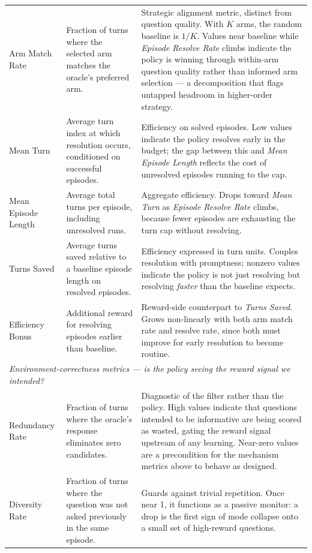 \documentclass[11pt]{article}
\theoremstyle{plain}
\theoremstyle{definition}
\theoremstyle{remark}
\begin{document}
\begin{table}[t]
\begin{tabularx}{\linewidth}{p{3.0cm}p{4.6cm}X}
Arm Match Rate & Fraction of turns where the selected arm matches the oracle's preferred arm. & Strategic alignment metric, distinct from question quality. With $K$ arms, the random baseline is $1/K$. Values near baseline while \emph{Episode Resolve Rate} climbs indicate the policy is winning through within-arm question quality rather than informed arm selection --- a decomposition that flags untapped headroom in higher-order strategy. \\
Mean Turn & Average turn index at which resolution occurs, conditioned on successful episodes. & Efficiency on solved episodes. Low values indicate the policy resolves early in the budget; the gap between this and \emph{Mean Episode Length} reflects the cost of unresolved episodes running to the cap. \\
Mean Episode Length & Average total turns per episode, including unresolved runs. & Aggregate efficiency. Drops toward \emph{Mean Turn} as \emph{Episode Resolve Rate} climbs, because fewer episodes are exhausting the turn cap without resolving. \\
Turns Saved & Average turns saved relative to a baseline episode length on resolved episodes. & Efficiency expressed in turn units. Couples resolution with promptness; nonzero values indicate the policy is not just resolving but resolving \emph{faster} than the baseline expects. \\
Efficiency Bonus & Additional reward for resolving episodes earlier than baseline. & Reward-side counterpart to \emph{Turns Saved}. Grows non-linearly with both arm match rate and resolve rate, since both must improve for early resolution to become routine. \\
\midrule
\multicolumn{3}{l}{\textit{Environment-correctness metrics --- is the policy seeing the reward signal we intended?}} \\
\midrule
Redundancy Rate & Fraction of turns where the oracle's response eliminates zero candidates. & Diagnostic of the filter rather than the policy. High values indicate that questions intended to be informative are being scored as wasted, gating the reward signal upstream of any learning. Near-zero values are a precondition for the mechanism metrics above to behave as designed. \\
Diversity Rate & Fraction of turns where the question was not asked previously in the same episode. & Guards against trivial repetition. Once near 1, it functions as a passive monitor: a drop is the first sign of mode collapse onto a small set of high-reward questions. \\

\end{tabularx}
\end{table}
\end{document}
